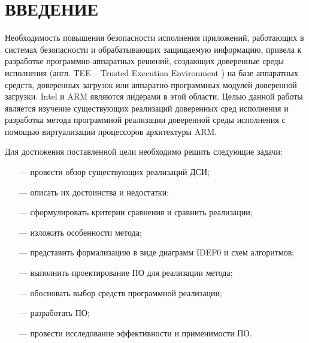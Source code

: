 \section*{ВВЕДЕНИЕ}

Необходимость повышения безопасности исполнения приложений, работающих в системах безопасности и обрабатывающих защищаемую информацию, привела к разработке программно-аппаратных решений, создающих доверенные среды исполнения (англ. TEE -- Trusted Execution Environment \cite{tee}) на базе аппаратных средств, доверенных загрузок или аппаратно-программных модулей доверенной загрузки. Intel \cite{intel} и ARM \cite{arm} являются лидерами в этой области. Целью данной работы является изучение существующих реализаций доверенных сред исполнения и разработка метода программной реализации доверенной среды исполнения с помощью виртуализации процессоров архитектуры ARM.

Для достижения поставленной цели необходимо решить следующие задачи:

\begin{itemize}
	\item [---] провести обзор существующих реализаций ДСИ;
	\item [---] описать их достоинства и недостатки;
	\item [---] сформулировать критерии сравнения и сравнить реализации;
	\item [---] изложить особенности метода;
	\item [---] представить формализацию в виде диаграмм IDEF0 и схем алгоритмов;
	\item [---] выполнить проектирование ПО для реализации метода;
	\item [---] обосновать выбор средств программной реализации;
	\item [---] разработать ПО;
	\item [---] провести исследование эффективности и применимости ПО.
\end{itemize}

\pagebreak
